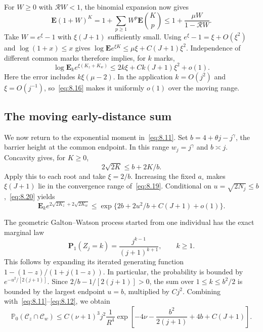 \documentclass[11pt,a4paper]{article}
\numberwithin{equation}{section}
\theoremstyle{remark}
\begin{document}
For $W\ge0$ with $\mathcal RW<1$, the binomial expansion now gives
\begin{equation}\label{eq:8.19}
\mathbf E(1+W)^K
=1+\sum_{p\ge1}W^p\mathbf E\binom Kp
\le1+\frac{\mu W}{1-\mathcal RW}.
\end{equation}
Take $W=e^\xi-1$ with $\xi(J+1)$ sufficiently small. Using $e^\xi-1=\xi+O(\xi^2)$ and $\log(1+x)\le x$ gives $\log\mathbf E e^{\xi K}\le\mu\xi+C(J+1)\xi^2$. Independence of different common marks therefore implies, for $k$ marks,
\begin{equation}\label{eq:8.20}
\log\mathbf E_k e^{\xi(K_z+K_w)}
\le2k\xi+Ck(J+1)\xi^2+o(1).
\end{equation}
Here the error includes $k\xi(\mu-2)$. In the application $k=O(j^2)$ and $\xi=O(j^{-1})$, so~\eqref{eq:8.16} makes it uniformly $o(1)$ over the moving range.

\subsection{The moving early-distance sum}\label{sec:earlysum}
We now return to the exponential moment in~\eqref{eq:8.11}. Set $b=4+\theta j-j^\gamma$, the barrier height at the common endpoint. In this range $w_j=j^\gamma$ and $b\asymp j$. Concavity gives, for $K\ge0$,
\begin{equation}\label{eq:8.21}
2\sqrt{2K}\le b+2K/b.
\end{equation}
Apply this to each root and take $\xi=2/b$. Increasing the fixed $a_\circ$ makes $\xi(J+1)$ lie in the convergence range of~\eqref{eq:8.19}. Conditional on $u=\sqrt{2N_j}\le b$,~\eqref{eq:8.20} yields
\begin{equation}\label{eq:8.22}
\mathbf E_k e^{2\sqrt{2K_z}+2\sqrt{2K_w}}
\le\exp\{2b+2u^2/b+C(J+1)+o(1)\}.
\end{equation}

The geometric Galton--Watson process started from one individual has the exact marginal law
\begin{equation}\label{eq:8.23}
\mathbf P_1(Z_j=k)=\frac{j^{k-1}}{(j+1)^{k+1}},\qquad k\ge1.
\end{equation}
This follows by expanding its iterated generating function
$1-(1-z)/(1+j(1-z))$. In particular, the probability is bounded by
$e^{-u^2/[2(j+1)]}$. Since $2/b-1/[2(j+1)]>0$, the sum over
$1\le k\le b^2/2$ is bounded by the largest endpoint $u=b$, multiplied by $Cj^2$. Combining with~\eqref{eq:8.11}--\eqref{eq:8.12}, we obtain
\begin{equation}\label{eq:8.24}
\mathbb P_0(\mathcal C_z\cap\mathcal C_w)
\le C(\nu+1)^3j^2\frac{1}{R^4}
\exp\left[-4\nu-\frac{b^2}{2(j+1)}+4b+C(J+1)\right].
\end{equation}
\end{document}
